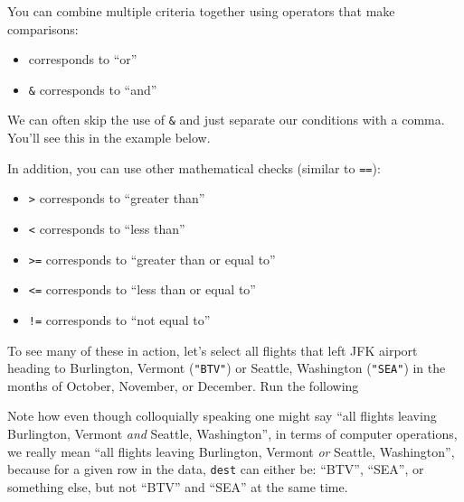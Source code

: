 \documentclass[]{tufte-book}
\newenvironment{Shaded}{\begin{snugshade}}{\end{snugshade}}
\newcommand{\KeywordTok}[1]{\textcolor[rgb]{0.13,0.29,0.53}{\textbf{{#1}}}}
\newcommand{\DecValTok}[1]{\textcolor[rgb]{0.00,0.00,0.81}{{#1}}}
\newcommand{\StringTok}[1]{\textcolor[rgb]{0.31,0.60,0.02}{{#1}}}
\newcommand{\NormalTok}[1]{{#1}}
\providecommand{\tightlist}{%
  \setlength{\itemsep}{0pt}\setlength{\parskip}{0pt}}
\begin{document}
You can combine multiple criteria together using operators that make
comparisons:

\begin{itemize}
\tightlist
\item
  \texttt{\textbar{}} corresponds to ``or''
\item
  \texttt{\&} corresponds to ``and''
\end{itemize}

We can often skip the use of \texttt{\&} and just separate our
conditions with a comma. You'll see this in the example below.

In addition, you can use other mathematical checks (similar to
\texttt{==}):

\begin{itemize}
\tightlist
\item
  \texttt{\textgreater{}} corresponds to ``greater than''
\item
  \texttt{\textless{}} corresponds to ``less than''
\item
  \texttt{\textgreater{}=} corresponds to ``greater than or equal to''
\item
  \texttt{\textless{}=} corresponds to ``less than or equal to''
\item
  \texttt{!=} corresponds to ``not equal to''
\end{itemize}

To see many of these in action, let's select all flights that left JFK
airport heading to Burlington, Vermont (\texttt{"BTV"}) or Seattle,
Washington (\texttt{"SEA"}) in the months of October, November, or
December. Run the following

\begin{Shaded}
\end{Shaded}

Note how even though colloquially speaking one might say ``all flights
leaving Burlington, Vermont \emph{and} Seattle, Washington'', in terms
of computer operations, we really mean ``all flights leaving Burlington,
Vermont \emph{or} Seattle, Washington'', because for a given row in the
data, \texttt{dest} can either be: ``BTV'', ``SEA'', or something else,
but not ``BTV'' and ``SEA'' at the same time.
\end{document}
